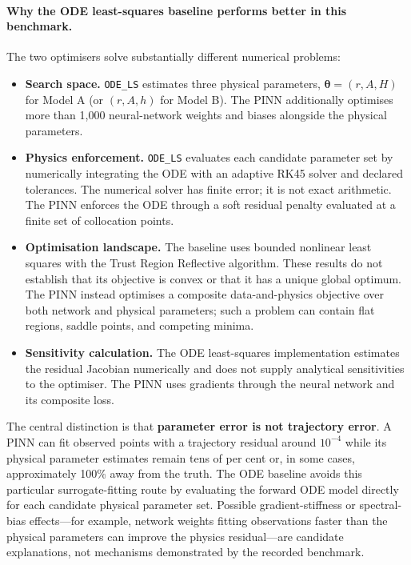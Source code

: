 \paragraph{Why the ODE least-squares baseline performs better in this benchmark.}
The two optimisers solve substantially different numerical problems:
\begin{itemize}
  \item \textbf{Search space.} \texttt{ODE\_LS} estimates three physical
  parameters, $\boldsymbol{\theta}=(r,A,H)$ for Model A (or
  $(r,A,h)$ for Model B). The PINN additionally optimises more than
  1,000 neural-network weights and biases alongside the physical
  parameters.
  \item \textbf{Physics enforcement.} \texttt{ODE\_LS} evaluates each
  candidate parameter set by numerically integrating the ODE with an
  adaptive RK45 solver and declared tolerances. The numerical solver has
  finite error; it is not exact arithmetic. The PINN enforces the ODE
  through a soft residual penalty evaluated at a finite set of
  collocation points.
  \item \textbf{Optimisation landscape.} The baseline uses bounded
  nonlinear least squares with the Trust Region Reflective algorithm.
  These results do not establish that its objective is convex or that it
  has a unique global optimum. The PINN instead optimises a composite
  data-and-physics objective over both network and physical parameters;
  such a problem can contain flat regions, saddle points, and competing
  minima.
  \item \textbf{Sensitivity calculation.} The ODE least-squares
  implementation estimates the residual Jacobian numerically and does
  not supply analytical sensitivities to the optimiser. The PINN uses
  gradients through the neural network and its composite loss.
\end{itemize}

The central distinction is that \textbf{parameter error is not trajectory
error}. A PINN can fit observed points with a trajectory residual around
$10^{-4}$ while its physical parameter estimates remain tens of per cent
or, in some cases, approximately 100\% away from the truth. The ODE
baseline avoids this particular surrogate-fitting route by evaluating the
forward ODE model directly for each candidate physical parameter set.
Possible gradient-stiffness or spectral-bias effects---for example, network
weights fitting observations faster than the physical parameters can
improve the physics residual---are candidate explanations, not mechanisms
demonstrated by the recorded benchmark.

